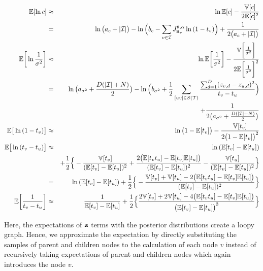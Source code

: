 \documentclass{article}
\begin{document}
	\begin{eqnarray}
		\mathbb{E}[\ln{c}] &\approx & \ln{\mathbb{E}[c]} - \frac{\mathbb{V}[c]}{2\mathbb{E}[c]^2} \nonumber \\
		&=& \ln{ \big( a_c + |\mathcal{I}| \big)} - \ln{ \Big( b_c - \sum_{v \in \mathcal{I}}J^{\theta, \alpha}_{\bold{n}_v}\ln{(1 - t_v})\Big)} + \frac{1}{2 \big( a_c + |\mathcal{I}| \big)} \\
		\mathbb{E} \bigg[ \ln{\frac{1}{\sigma^2}} \bigg] &\approx & \ln{\mathbb{E} \bigg[ \frac{1}{\sigma^2} \bigg]} - \frac{\mathbb{V}\bigg[ \frac{1}{\sigma^2} \bigg]}{2\mathbb{E}\bigg[ \frac{1}{\sigma^2} \bigg]^2} \nonumber \\
		&=& \ln{ \big( a_{\sigma^2} + \frac{D(|\mathcal{I}| + N)}{2} \big) } - \ln{ \Big( b_{\sigma^2} + \frac{1}{2}\sum_{[uv] \in S(\mathcal{T})}\frac{\sum^D_{d=1}(z_{v,d} - z_{u,d})^2}{t_v - t_u}\Big)} \nonumber \\
		& & + \frac{1}{2 \big( a_{\sigma^2} + \frac{D(|\mathcal{I}| + N)}{2} \big)}	 \nonumber \\
		\mathbb{E} \big[ \ln{(1 - t_v)} \big] &\approx & \ln{ \big( 1 - \mathbb{E}[t_v] \big)} - \frac{\mathbb{V}[t_v]}{2 \big( 1 - \mathbb{E}[t_v] \big)^2} \\
		\mathbb{E} \big[ \ln{(t_v - t_u)} \big] &\approx & \ln{(\mathbb{E}[t_v] - \mathbb{E}[t_u])} \nonumber \\
		& & + \frac{1}{2} \Big\{ -\frac{\mathbb{V}[t_v]}{(\mathbb{E}[t_v] - \mathbb{E}[t_u])^2} + \frac{2\big( \mathbb{E}[t_v t_u] - \mathbb{E}[t_v] \mathbb{E}[t_u] \big)}{(\mathbb{E}[t_v] - \mathbb{E}[t_u])^2} - \frac{\mathbb{V}[t_u]}{(\mathbb{E}[t_v] - \mathbb{E}[t_u])^2} \Big\} \nonumber \\
		&=& \ln{(\mathbb{E}[t_v] - \mathbb{E}[t_u])} + \frac{1}{2} \Big\{ -\frac{\mathbb{V}[t_v] + \mathbb{V}[t_u] - 2\big( \mathbb{E}[t_v t_u] - \mathbb{E}[t_v] \mathbb{E}[t_u] \big)}{(\mathbb{E}[t_v] - \mathbb{E}[t_u])^2} \Big\} \\
		\mathbb{E} \bigg[\frac{1}{t_v - t_u} \bigg] &\approx & \frac{1}{\mathbb{E}[t_v] - \mathbb{E}[t_u]} + \frac{1}{2} \Big\{ \frac{2\mathbb{V}[t_v] + 2\mathbb{V}[t_u] - 4\big( \mathbb{E}[t_v t_u] - \mathbb{E}[t_v] \mathbb{E}[t_u] \big)}{ \big( \mathbb{E}[t_v] - \mathbb{E}[t_u] \big)^3} \Big\}
	\end{eqnarray}

Here, the expectations of $\bold{z}$ terms with the posterior distributions create a loopy graph. Hence, we approximate the expectation by directly substituting the samples of parent and children nodes to the calculation of each node $v$ instead of recursively taking expectations of parent and children nodes which again introduces the node $v$.
	
\end{document}

